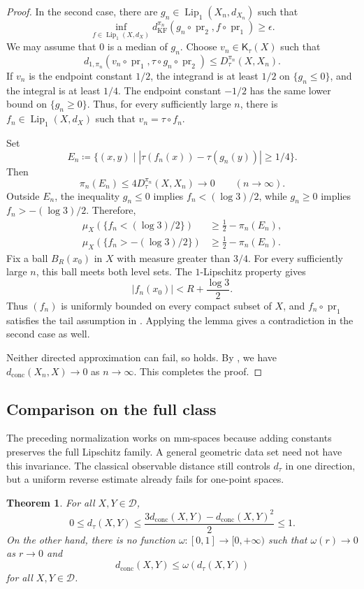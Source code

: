 \documentclass[11pt]{amsart}
\theoremstyle{plain}
\newtheorem{theorem}{Theorem}[section]
\theoremstyle{definition}
\theoremstyle{remark}
\newcommand{\D}{\mathcal D}
\newcommand{\Kc}{\mathsf K}
\newcommand{\dconc}{d_{\mathrm{conc}}}
\newcommand{\dtau}{d_{\tau}}
\newcommand{\kf}{d_{\operatorname{KF}}}
\DeclareMathOperator{\pr}{pr}
\begin{document}
\begin{proof}
In the second case, there are $g_n\in\operatorname{Lip}_1(X_n,d_{X_n})$ such that
\[
\inf_{f\in\operatorname{Lip}_1(X,d_X)}
\kf^{\pi_n}(g_n\circ\pr_2,f\circ\pr_1)\geq\epsilon.
\]
We may assume that $0$ is a median of $g_n$. Choose $v_n\in\Kc_\tau(X)$ such that
\[
d_{1,\pi_n}(v_n\circ\pr_1,\tau\circ g_n\circ\pr_2)
\leq D_\tau^{\pi_n}(X,X_n).
\]
If $v_n$ is the endpoint constant $1/2$, the integrand is at least $1/2$ on $\{g_n\leq0\}$, and the integral is at least $1/4$. The endpoint constant $-1/2$ has the same lower bound on $\{g_n\geq0\}$. Thus, for every sufficiently large $n$, there is $f_n\in\operatorname{Lip}_1(X,d_X)$ such that $v_n=\tau\circ f_n$.

Set
\[
E_n\coloneqq
\{(x,y)\mid|\tau(f_n(x))-\tau(g_n(y))|\geq1/4\}.
\]
Then
\[
\pi_n(E_n)\leq4D_\tau^{\pi_n}(X,X_n)\longrightarrow0
\qquad(n\to\infty).
\]
Outside $E_n$, the inequality $g_n\leq0$ implies $f_n<(\log3)/2$, while $g_n\geq0$ implies $f_n>-(\log3)/2$. Therefore,
\[
\begin{aligned}
\mu_X(\{f_n<(\log3)/2\})&\geq\frac12-\pi_n(E_n),\\
\mu_X(\{f_n>-(\log3)/2\})&\geq\frac12-\pi_n(E_n).
\end{aligned}
\]
Fix a ball $B_R(x_0)$ in $X$ with measure greater than $3/4$. For every sufficiently large $n$, this ball meets both level sets. The $1$-Lipschitz property gives
\[
|f_n(x_0)|<R+\frac{\log3}{2}.
\]
Thus $(f_n)$ is uniformly bounded on every compact subset of $X$, and $f_n\circ\pr_1$ satisfies the tail assumption in . Applying the lemma gives a contradiction in the second case as well.

Neither directed approximation can fail, so  holds. By , we have $\dconc(X_n,X)\to0$ as $n\to\infty$. This completes the proof.
\end{proof}

\subsection{Comparison on the full class}
\label{subsec:full-comparison}

The preceding normalization works on mm-spaces because adding constants preserves the full Lipschitz family. A general geometric data set need not have this invariance. The classical observable distance still controls $\dtau$ in one direction, but a uniform reverse estimate already fails for one-point spaces.

\begin{theorem}
\label{thm:comparison}
For all $X,Y\in\D$,
\[
0\leq\dtau(X,Y)
\leq\frac{3\dconc(X,Y)-\dconc(X,Y)^2}{2}
\leq1.
\]
On the other hand, there is no function $\omega\colon[0,1]\to[0,+\infty)$ such that $\omega(r)\to0$ as $r\to0$ and
\[
\dconc(X,Y)\leq\omega(\dtau(X,Y))
\]
for all $X,Y\in\D$.
\end{theorem}
\end{document}
